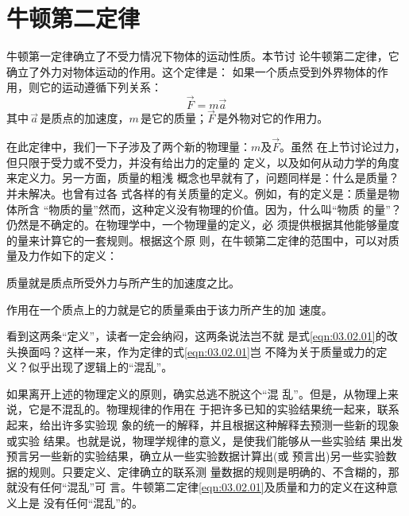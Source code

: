 \section{牛顿第二定律}\label{sec:03.02}

{牛顿第一定律确立了不受力情况下物体的运动性质。本节讨
论牛顿第二定律，它确立了外力对物体运动的作用。这个定律是：
如果一个质点受到外界物体的作用，则它的运动遵循下列关系：}
\begin{equation}\label{eqn:03.02.01}
    \vec{F} = m \vec{a}
\end{equation}
其中\,$\vec{a}$\,是质点的加速度，$m$\,是它的质量；$\vec{F}$\,是外物对它的作用力。

{在此定律中，我们一下子涉及了两个新的物理量：$m$及$\vec{F}$。虽然
在上节讨论过力，但只限于受力或不受力，并没有给出力的定量的
定义，以及如何从动力学的角度来定义力。另一方面，质量的粗浅
概念也早就有了，问题同样是：什么是质量？并未解决。也曾有过各
式各样的有关质量的定义。例如，有的定义是：质量是物体所含
“物质的量”然而，这种定义没有物理的价值。因为，什么叫“物质
的量”？仍然是不确定的。在物理学中，一个物理量的定义，必
须提供根据其他能够量度的量来计算它的一套规则。根据这个原
则，在牛顿第二定律的范围中，可以对质量及力作如下的定义：}

质量就是质点所受外力与所产生的加速度之比。

作用在一个质点上的力就是它的质量乘由于该力所产生的加
速度。

看到这两条“定义”，读者一定会纳闷，这两条说法岂不就
是式\eqref{eqn:03.02.01}的改头换面吗？这样一来，作为定律的式\eqref{eqn:03.02.01}岂
不降为关于质量或力的定义？似乎出现了逻辑上的“混乱”。

如果离开上述的物理定义的原则，确实总逃不脱这个“混
乱”。但是，从物理上来说，它是不混乱的。物理规律的作用在
于把许多已知的实验结果统一起来，联系起来，给出许多实验现
象的统一的解释，并且根据这种解释去预测一些新的现象或实验
结果。也就是说，物理学规律的意义，是使我们能够从一些实验结
果出发预言另一些新的实验结果，确立从一些实验数据计算出(或
预言出)另一些实验数据的规则。只要定义、定律确立的联系测
量数据的规则是明确的、不含糊的，那就没有任何“混乱”可
言。牛顿第二定律\lhbrak \eqref{eqn:03.02.01}\rhbrak 及质量和力的定义在这种意义上是
没有任何“混乱”的。

